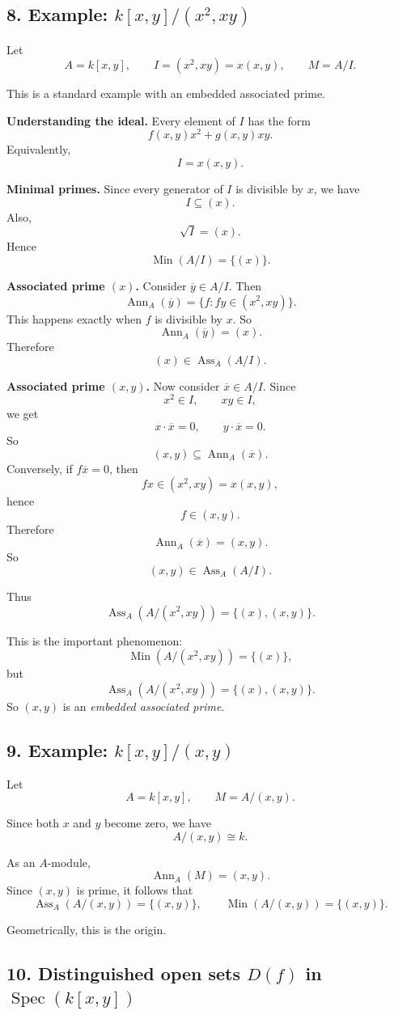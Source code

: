 \documentclass[12pt,a4paper]{article}
\theoremstyle{notespace}
\DeclareMathOperator{\Spec}{Spec}
\DeclareMathOperator{\Ass}{Ass}
\DeclareMathOperator{\Ann}{Ann}
\DeclareMathOperator{\Min}{Min}
\begin{document}
\subsection{8. Example: \(k[x,y]/(x^2,xy)\)}

Let
\[
A=k[x,y],\qquad I=(x^2,xy)=x(x,y),\qquad M=A/I.
\]

This is a standard example with an embedded associated prime.

\textbf{Understanding the ideal.}
Every element of \(I\) has the form
\[
f(x,y)x^2+g(x,y)xy.
\]
Equivalently,
\[
I=x(x,y).
\]

\textbf{Minimal primes.}
Since every generator of \(I\) is divisible by \(x\), we have
\[
I\subseteq (x).
\]
Also,
\[
\sqrt{I}=(x).
\]
Hence
\[
\Min(A/I)=\{(x)\}.
\]

\textbf{Associated prime \((x)\).}
Consider \(\overline y\in A/I\). Then
\[
\Ann_A(\overline y)=\{f:fy\in (x^2,xy)\}.
\]
This happens exactly when \(f\) is divisible by \(x\). So
\[
\Ann_A(\overline y)=(x).
\]
Therefore
\[
(x)\in \Ass_A(A/I).
\]

\textbf{Associated prime \((x,y)\).}
Now consider \(\overline x\in A/I\). Since
\[
x^2\in I,\qquad xy\in I,
\]
we get
\[
x\cdot \overline x=0,\qquad y\cdot \overline x=0.
\]
So
\[
(x,y)\subseteq \Ann_A(\overline x).
\]
Conversely, if \(f\overline x=0\), then
\[
fx\in (x^2,xy)=x(x,y),
\]
hence
\[
f\in (x,y).
\]
Therefore
\[
\Ann_A(\overline x)=(x,y).
\]
So
\[
(x,y)\in \Ass_A(A/I).
\]

Thus
\[
\Ass_A(A/(x^2,xy))=\{(x),(x,y)\}.
\]

This is the important phenomenon:
\[
\Min(A/(x^2,xy))=\{(x)\},
\]
but
\[
\Ass_A(A/(x^2,xy))=\{(x),(x,y)\}.
\]
So \((x,y)\) is an \emph{embedded associated prime}.

\subsection{9. Example: \(k[x,y]/(x,y)\)}

Let
\[
A=k[x,y],\qquad M=A/(x,y).
\]

Since both \(x\) and \(y\) become zero, we have
\[
A/(x,y)\cong k.
\]

As an \(A\)-module,
\[
\Ann_A(M)=(x,y).
\]
Since \((x,y)\) is prime, it follows that
\[
\Ass_A(A/(x,y))=\{(x,y)\},
\qquad
\Min(A/(x,y))=\{(x,y)\}.
\]

Geometrically, this is the origin.

\subsection{10. Distinguished open sets \(D(f)\) in \(\Spec(k[x,y])\)}
\end{document}

